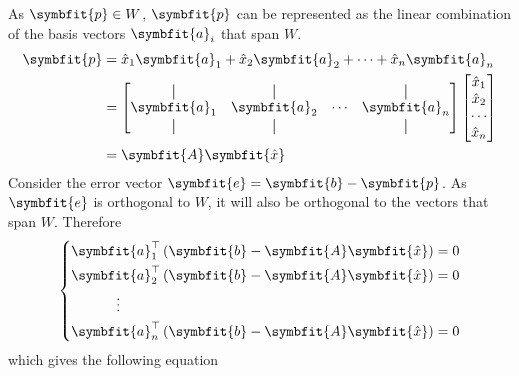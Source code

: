 \documentclass{article}
\begin{document}
\begin{solution}[Proof]
    As \(\symbfit{p}\in W\), \(\symbfit{p}\) can be represented as the
    linear combination of the basis vectors \(\symbfit{a}_i\) that span
    \(W\).
    \begin{align*}
        \symbfit{p} & = \hat{x}_1 \symbfit{a}_1 + \hat{x}_2 \symbfit{a}_2 + \cdots + \hat{x}_n \symbfit{a}_n \\
                    & =
        \begin{bmatrix}
            \vertbar      & \vertbar      &        & \vertbar      \\
            \symbfit{a}_1 & \symbfit{a}_2 & \cdots & \symbfit{a}_n \\
            \vertbar      & \vertbar      &        & \vertbar
        \end{bmatrix}
        \begin{bmatrix}
            \hat{x}_1 \\
            \hat{x}_2 \\
            \cdots    \\
            \hat{x}_n
        \end{bmatrix}                                                                                       \\
                    & = \symbfit{A}\symbfit{\hat{x}}
    \end{align*}
    Consider the error vector \(\symbfit{e}=\symbfit{b}-\symbfit{p}\).
    As \(\symbfit{e}\) is orthogonal to \(W\), it will also be
    orthogonal to the vectors that span \(W\). Therefore
    \begin{equation*}
        \left\{
        \begin{aligned}
            \symbfit{a}_1^\top\left( \symbfit{b}-\symbfit{A}\symbfit{\hat{x}} \right)                         & = 0 \\
            \symbfit{a}_2^\top\left( \symbfit{b}-\symbfit{A}\symbfit{\hat{x}} \right)                         & = 0 \\
            \vdotswithin{\symbfit{a}_3^\top}\phantom{\left( \symbfit{b}-\symbfit{A}\symbfit{\hat{x}} \right)} &     \\
            \symbfit{a}_n^\top\left( \symbfit{b}-\symbfit{A}\symbfit{\hat{x}} \right)                         & = 0
        \end{aligned}
        \right.
    \end{equation*}
    which gives the following equation
    \begin{equation*}

\end{equation*}
\end{solution}
\end{document}
